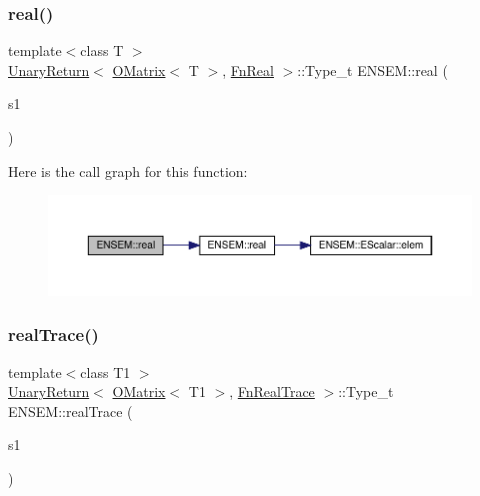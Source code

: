 \subsubsection{\texorpdfstring{real()}{real()}}
{\footnotesize\ttfamily template$<$class T $>$ \\
\mbox{\hyperlink{structENSEM_1_1UnaryReturn}{Unary\+Return}}$<$ \mbox{\hyperlink{classENSEM_1_1OMatrix}{O\+Matrix}}$<$ T $>$, \mbox{\hyperlink{structENSEM_1_1FnReal}{Fn\+Real}} $>$\+::Type\+\_\+t E\+N\+S\+E\+M\+::real (\begin{DoxyParamCaption}\item[{const \mbox{\hyperlink{classENSEM_1_1OMatrix}{O\+Matrix}}$<$ T $>$ \&}]{s1 }\end{DoxyParamCaption})\hspace{0.3cm}{\ttfamily [inline]}}

Here is the call graph for this function\+:\nopagebreak
\begin{figure}[H]
\begin{center}
\leavevmode
\includegraphics[width=350pt]{d8/d55/group__obsmatrix_gaa89ce5a88c3ccb5020ce1319e041cacd_cgraph}
\end{center}
\end{figure}
\mbox{\label{group__obsmatrix_gab3988428b88d3b56d2f959c536ec7d2a}} 
\subsubsection{\texorpdfstring{realTrace()}{realTrace()}}
{\footnotesize\ttfamily template$<$class T1 $>$ \\
\mbox{\hyperlink{structENSEM_1_1UnaryReturn}{Unary\+Return}}$<$ \mbox{\hyperlink{classENSEM_1_1OMatrix}{O\+Matrix}}$<$ T1 $>$, \mbox{\hyperlink{structENSEM_1_1FnRealTrace}{Fn\+Real\+Trace}} $>$\+::Type\+\_\+t E\+N\+S\+E\+M\+::real\+Trace (\begin{DoxyParamCaption}\item[{const \mbox{\hyperlink{classENSEM_1_1OMatrix}{O\+Matrix}}$<$ T1 $>$ \&}]{s1 }\end{DoxyParamCaption})\hspace{0.3cm}{\ttfamily [inline]}}

